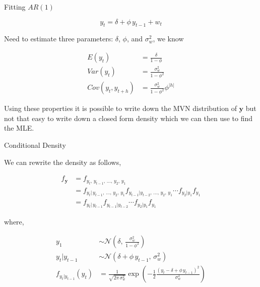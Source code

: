 \documentclass[11pt,ignorenonframetext,]{beamer}
\begin{document}
\begin{frame}[t]{Fitting \(AR(1)\)}

\[ y_t = \delta + \phi \, y_{t-1} + w_t \]

Need to estimate three parameters: \(\delta\), \(\phi\), and
\(\sigma_w^2\), we know

\[ 
\begin{aligned}
E(y_t) &= \frac{\delta}{1-\phi} \\
Var(y_t) &= \frac{\sigma_w^2}{1-\phi^2} \\
Cov(y_t, y_{t+h}) &= \frac{\sigma_w^2}{1-\phi^2} \phi^{|h|}
\end{aligned} 
\]

Using these properties it is possible to write down the MVN distribution
of \(\bm{y}\) but not that easy to write down a closed form density
which we can then use to find the MLE.

\end{frame}

\begin{frame}{Conditional Density}

We can rewrite the density as follows,

\[
\begin{aligned}
f_{\bm y}
  &= f_{y_t,\,y_{t-1},\,\ldots,\,y_2,\,y_1} \\
  &= f_{y_t|\,y_{t-1},\,\ldots,\,y_2,\,y_1} f_{y_{t-1}|y_{t-2},\,\ldots,\,y_2,\,y_1} \cdots f_{y_2|y_1} f_{y_1} \\
  &= f_{y_t|\,y_{t-1}} f_{y_{t-1}|y_{t-2}} \cdots f_{y_2|y_1} f_{y_1} 
\end{aligned}
\]

where,

\[
\begin{aligned}
y_1 &\sim \mathcal{N}\left(\delta, \, \frac{\sigma^2_w}{1-\phi^2} \right) \\
y_{t}|y_{t-1} &\sim \mathcal{N}\left(\delta+\phi\, y_{t-1}, \, \sigma^2_w \right) \\
f_{y_{t}|y_{t-1}}(y_t) &= \frac{1}{\sqrt{2\pi \, \sigma^2_w}} \exp \left( -\frac{1}{2}\frac{(y_t -\delta+\phi\, y_{t-1})^2 }{\sigma^2_w} \right)
\end{aligned}
\]

\end{frame}
\end{document}
